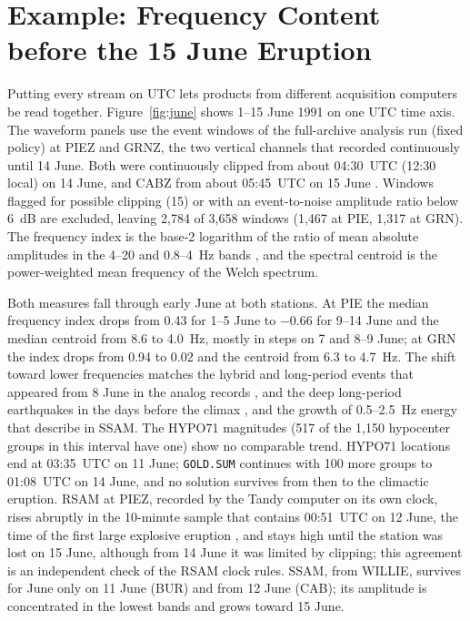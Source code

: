 \documentclass[linenum]{SSA-SRL}
\newcommand{\file}[1]{\texttt{#1}}
\begin{document}
\section{Example: Frequency Content before the 15 June Eruption}

Putting every stream on UTC lets products from different acquisition computers be read together. Figure~\ref{fig:june} shows 1--15 June 1991 on one UTC time axis. The waveform panels use the event windows of the full-archive analysis run (fixed policy) at PIEZ and GRNZ, the two vertical channels that recorded continuously until 14 June. Both were continuously clipped from about 04:30~UTC (12:30 local) on 14 June, and CABZ from about 05:45~UTC on 15 June \citep{Power_1996}. Windows flagged for possible clipping (15) or with an event-to-noise amplitude ratio below 6~dB are excluded, leaving 2,784 of 3,658 windows (1,467 at PIE, 1,317 at GRN). The frequency index is the base-2 logarithm of the ratio of mean absolute amplitudes in the 4--20 and 0.8--4~Hz bands \citep[after][]{Buurman_2010}, and the spectral centroid is the power-weighted mean frequency of the Welch spectrum.

Both measures fall through early June at both stations. At PIE the median frequency index drops from 0.43 for 1--5 June to $-$0.66 for 9--14 June and the median centroid from 8.6 to 4.0~Hz, mostly in steps on 7 and 8--9 June; at GRN the index drops from 0.94 to 0.02 and the centroid from 6.3 to 4.7~Hz. The shift toward lower frequencies matches the hybrid and long-period events that appeared from 8 June in the analog records \citep{Harlow_1996}, and the deep long-period earthquakes in the days before the climax \citep{White_1996}, and the growth of 0.5--2.5~Hz energy that \citet{Power_1996} describe in SSAM. The HYPO71 magnitudes (517 of the 1,150 hypocenter groups in this interval have one) show no comparable trend. HYPO71 locations end at 03:35~UTC on 11 June; \file{GOLD.SUM} continues with 100 more groups to 01:08~UTC on 14 June, and no solution survives from then to the climactic eruption. RSAM at PIEZ, recorded by the Tandy computer on its own clock, rises abruptly in the 10-minute sample that contains 00:51~UTC on 12 June, the time of the first large explosive eruption \citep{Wolfe_1996}, and stays high until the station was lost on 15 June, although from 14 June it was limited by clipping; this agreement is an independent check of the RSAM clock rules. SSAM, from WILLIE, survives for June only on 11 June (BUR) and from 12 June (CAB); its amplitude is concentrated in the lowest bands and grows toward 15 June.
\end{document}
